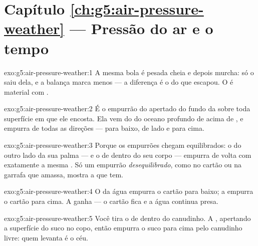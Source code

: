 \section*{Capítulo \ref{ch:g5:air-pressure-weather} --- Pressão do ar e o tempo}

\begin{solution}{exo:g5:air-pressure-weather:1}
A mesma bola é pesada cheia e depois murcha: só o  saiu dela, e a
balança marca menos --- a diferença é o  do  que escapou. O 
é material com .
\end{solution}

\begin{solution}{exo:g5:air-pressure-weather:2}
É o empurrão do  apertado do fundo da  sobre toda
superfície em que ele encosta. Ela vem do  do oceano profundo de
 acima de , e empurra de todas as direções --- para baixo, de
lado e para cima.
\end{solution}

\begin{solution}{exo:g5:air-pressure-weather:3}
Porque os empurrões chegam equilibrados: o  do outro lado da sua
palma --- e o de dentro do seu corpo --- empurra de volta com
exatamente a mesma . Só um empurrão \emph{desequilibrado}, como
no cartão ou na garrafa que amassa, mostra a  que tem.
\end{solution}

\begin{solution}{exo:g5:air-pressure-weather:4}
O  da água empurra o cartão para baixo; a  empurra o
cartão para cima. A  ganha --- o cartão fica e a água
continua presa.
\end{solution}

\begin{solution}{exo:g5:air-pressure-weather:5}
Você tira o \emph{} de dentro do canudinho. A , apertando
a superfície do suco no copo, então empurra o suco para cima pelo
canudinho livre: quem levanta é o céu.
\end{solution}

